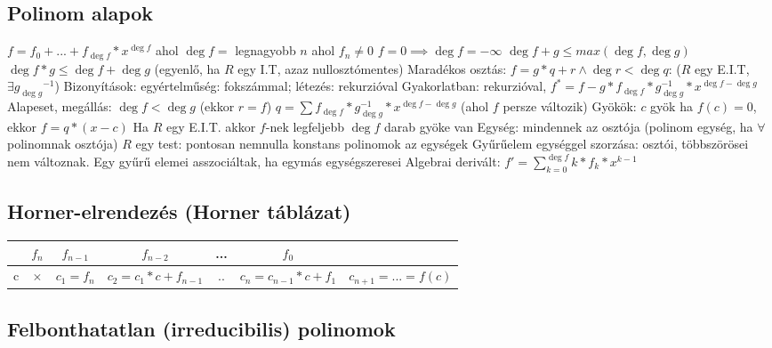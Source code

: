\documentclass[12pt,a4paper]{article}
\begin{document}
\subsection{Polinom alapok}

\begin{outline}
	\1 $f = f_0 + ... + f_{\deg f}*x^{\deg f}$ ahol $\deg f=$ legnagyobb $n$ ahol $f_n \ne 0$
		\2 $f = 0 \implies \deg f = -\infty$
	\1 $\deg f+g \le max(\deg f, \deg g)$
	\1 $\deg f*g \le \deg f + \deg g$ (egyenlő, ha $R$ egy I.T, azaz nullosztómentes)
	\1 Maradékos osztás: $f=g*q+r \wedge \deg r < \deg q$: ($R$ egy E.I.T, $\exists {g_{\deg g}}^{-1}$)
		\2 Bizonyítások: egyértelműség: fokszámmal; létezés: rekurzióval
		\2 Gyakorlatban: rekurzióval, $f^*=f-g*f_{\deg f}*g_{\deg g}^{-1}*x^{\deg f - \deg g}$
			\3 Alapeset, megállás: $\deg f < \deg g$ (ekkor $r=f$)
			\3 $q=\sum f_{\deg f}*g_{\deg g}^{-1}*x^{\deg f - \deg g}$ (ahol $f$ persze változik)
	\1 Gyökök: $c$ gyök ha $f(c)=0$, ekkor $f=q*(x-c)$
		\2 Ha $R$ egy E.I.T. akkor $f$-nek legfeljebb $\deg f$ darab gyöke van
	\1 Egység: mindennek az osztója (polinom egység, ha $\forall$ polinomnak osztója)
		\2 $R$ egy test: pontosan nemnulla konstans polinomok az egységek
		\2 Gyűrűelem egységgel szorzása: osztói, többszörösei nem változnak.
		\2 Egy gyűrű elemei asszociáltak, ha egymás egységszeresei
	\1 Algebrai derivált: $f'=\sum_{k=0}^{\deg f} k * f_k * x^{k-1}$
\end{outline}

\pagebreak

\subsection{Horner-elrendezés (Horner táblázat)}

\begin{table}[h!]
	\centering
	\begin{tabular}{|c|c|c|c|c|c|c|}
		\hline
		& $f_n$ & $f_{n-1}$ & $f_{n-2}$ & ... & $f_0$ & \\
		\hline
		c & $\times$ & $c_1=f_n$ & $c_2=c_1*c+f_{n-1}$ & .. & $c_n=c_{n-1}*c+f_1$ & $c_{n+1}=...=f(c)$ \\
		\hline
	\end{tabular}
\end{table}

\subsection{Felbonthatatlan (irreducibilis) polinomok}
\end{document}
